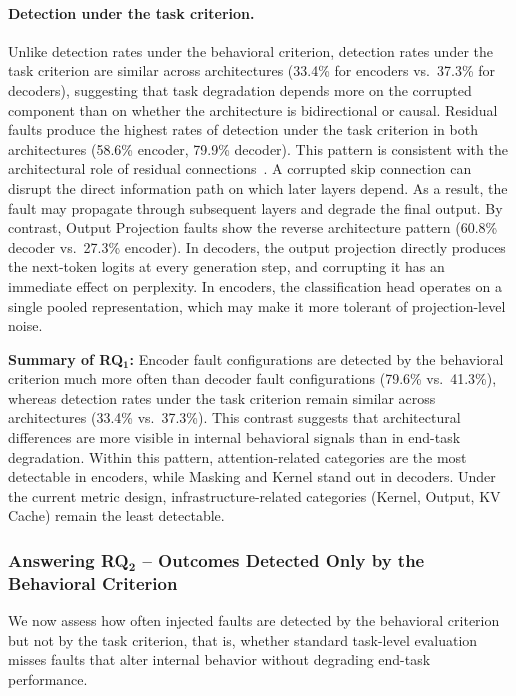 \paragraph{Detection under the task criterion.}
Unlike detection rates under the behavioral criterion, detection rates under the task criterion are similar across architectures (33.4\% for encoders vs.\ 37.3\% for decoders), suggesting that task degradation depends more on the corrupted component than on whether the architecture is bidirectional or causal. Residual faults produce the highest rates of detection under the task criterion in both architectures (58.6\% encoder, 79.9\% decoder). This pattern is consistent with the architectural role of residual connections~\cite{vaswani2017attention}. A corrupted skip connection can disrupt the direct information path on which later layers depend. As a result, the fault may propagate through subsequent layers and degrade the final output. By contrast, Output Projection faults show the reverse architecture pattern (60.8\% decoder vs.\ 27.3\% encoder). In decoders, the output projection directly produces the next-token logits at every generation step, and corrupting it has an immediate effect on perplexity. In encoders, the classification head operates on a single pooled representation, which may make it more tolerant of projection-level noise.

\begin{rqsummary}
\textbf{Summary of RQ$\mathbf{_1}$:} Encoder fault configurations are detected by the behavioral criterion much more often than decoder fault configurations (79.6\% vs.\ 41.3\%), whereas detection rates under the task criterion remain similar across architectures (33.4\% vs.\ 37.3\%). This contrast suggests that architectural differences are more visible in internal behavioral signals than in end-task degradation. Within this pattern, attention-related categories are the most detectable in encoders, while Masking and Kernel stand out in decoders. Under the current metric design, infrastructure-related categories (Kernel, Output, KV Cache) remain the least detectable.
\end{rqsummary}

\subsubsection{\textbf{Answering RQ$\mathbf{_2}$} -- Outcomes Detected Only by the Behavioral Criterion}

We now assess how often injected faults are detected by the behavioral criterion but not by the task criterion, that is, whether standard task-level evaluation misses faults that alter internal behavior without degrading end-task performance.

